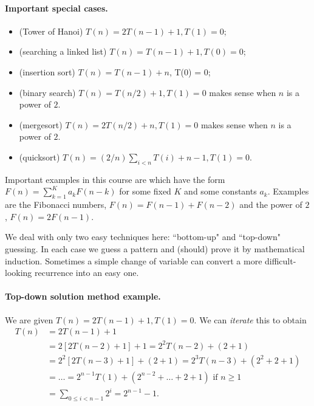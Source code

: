 \paragraph{Important special cases.}
\begin{itemize}
\item (Tower of Hanoi) $T(n) = 2 T(n - 1) + 1, T(1) = 0$;
\item (searching a linked list) $T(n) = T(n - 1) + 1, T(0) = 0$;
\item (insertion sort) $T(n) = T(n-1) + n$, T(0) = 0;
\item (binary search) $T(n) = T(n/2) + 1, T(1) = 0$ makes sense when $n$ is 
a power of $2$. 
\item (mergesort) $T(n) = 2T(n/2) + n, T(1) = 0$ makes sense when $n$ is 
a power of $2$.
\item (quicksort) $T(n) = (2/n)\sum_{i<n} T(i) + n-1, T(1) = 0$.
\end{itemize}


Important examples  in this course are  which have the form 
$F(n) = \sum_{k=1}^K a_k F(n - k)$ for some fixed $K$ and some constants $a_k$. 
Examples are the Fibonacci numbers, $F(n) = F(n-1) + F(n-2)$ and the power of $2$, $F(n) = 2F(n-1)$.

We deal with only two easy techniques here: ``bottom-up" and ``top-down" guessing. 
In each case we guess a pattern and (should) prove it by mathematical induction. 
Sometimes a simple change of variable can convert a more difficult-looking recurrence into an easy one. 


\paragraph{Top-down solution method example.}
\begin{Example}
We are given $T(n) = 2 T(n - 1) + 1, T(1) = 0$. We can \emph{iterate} this to obtain 
\begin{align*}
T(n) & = 2 T(n - 1) + 1  \\
& = 2 [2 T(n - 2) + 1] + 1 = 2^2 T(n-2) + (2 + 1) \\
& = 2^2 [2T(n - 3) + 1] + (2 + 1) = 2^3 T(n - 3) + (2^2 + 2+ 1)  \\ 
& = \dots = 2^{n-1} T(1) + (2^{n-2} + \dots + 2 + 1)  \text{ if $n \geq 1$} \\
& = \sum_{0\leq i < n-1} 2^i = 2^{n-1} - 1.
\end{align*}
\end{Example}

